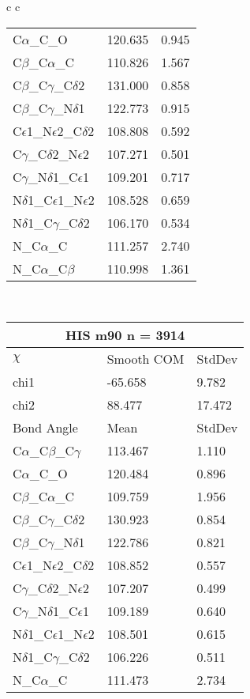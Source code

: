 \begin{longtable}{ c c }
\begin{tabular}{ l l l }
  C$\alpha$\_C\_O & 120.635 & 0.945\\
  C$\beta$\_C$\alpha$\_C & 110.826 & 1.567\\
  C$\beta$\_C$\gamma$\_C$\delta$2 & 131.000 & 0.858\\
  C$\beta$\_C$\gamma$\_N$\delta$1 & 122.773 & 0.915\\
  C$\epsilon$1\_N$\epsilon$2\_C$\delta$2 & 108.808 & 0.592\\
  C$\gamma$\_C$\delta$2\_N$\epsilon$2 & 107.271 & 0.501\\
  C$\gamma$\_N$\delta$1\_C$\epsilon$1 & 109.201 & 0.717\\
  N$\delta$1\_C$\epsilon$1\_N$\epsilon$2 & 108.528 & 0.659\\
  N$\delta$1\_C$\gamma$\_C$\delta$2 & 106.170 & 0.534\\
  N\_C$\alpha$\_C & 111.257 & 2.740\\
  N\_C$\alpha$\_C$\beta$ & 110.998 & 1.361\\
  \bottomrule
  \end{tabular}
  \\
  \begin{tabular}{ l l l }
  \toprule
  \multicolumn{3}{c}{HIS \textbf{m90} n = 3914} \\ \toprule
  $\chi$       & Smooth COM & StdDev \\ \midrule
  chi1 & -65.658 & 9.782 \\ 
  chi2 & 88.477 & 17.472 \\ \midrule
  Bond Angle   & Mean     & StdDev \\ \midrule
  C$\alpha$\_C$\beta$\_C$\gamma$ & 113.467 & 1.110\\
  C$\alpha$\_C\_O & 120.484 & 0.896\\
  C$\beta$\_C$\alpha$\_C & 109.759 & 1.956\\
  C$\beta$\_C$\gamma$\_C$\delta$2 & 130.923 & 0.854\\
  C$\beta$\_C$\gamma$\_N$\delta$1 & 122.786 & 0.821\\
  C$\epsilon$1\_N$\epsilon$2\_C$\delta$2 & 108.852 & 0.557\\
  C$\gamma$\_C$\delta$2\_N$\epsilon$2 & 107.207 & 0.499\\
  C$\gamma$\_N$\delta$1\_C$\epsilon$1 & 109.189 & 0.640\\
  N$\delta$1\_C$\epsilon$1\_N$\epsilon$2 & 108.501 & 0.615\\
  N$\delta$1\_C$\gamma$\_C$\delta$2 & 106.226 & 0.511\\
  N\_C$\alpha$\_C & 111.473 & 2.734\\

\end{tabular}
\end{longtable}

